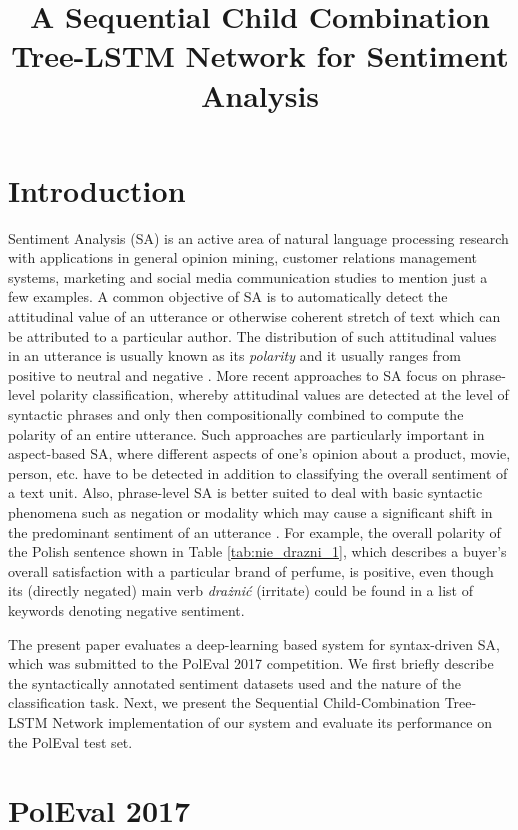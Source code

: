 \documentclass[10pt, a4paper]{article}
\title{A Sequential Child Combination Tree-LSTM Network for Sentiment Analysis}
\begin{document}
\maketitleabstract

\section{Introduction}   
Sentiment Analysis (SA) is an active area of natural language processing research with applications in general opinion mining, customer relations management systems, marketing and social media communication studies to mention just a few examples. A common objective of SA is to automatically detect the attitudinal value of an utterance or otherwise coherent stretch of text which can be attributed to a particular author. The distribution of  such attitudinal values in an utterance is usually known as its \textit{polarity} and it usually ranges from positive to neutral and negative \cite{cambria_schuller}. More recent approaches to SA focus on phrase-level polarity classification, whereby attitudinal values are detected at the level of syntactic phrases and only then compositionally combined to compute the polarity of an entire utterance. Such approaches are particularly important in aspect-based SA, where different aspects of one's opinion about a product, movie, person, etc. have to be detected in addition to  classifying the overall sentiment of a text unit. Also, phrase-level SA is better suited to deal with basic syntactic phenomena such as negation or modality which may cause a significant shift in the predominant sentiment of an utterance \cite{wilson_wiebe}. For example, the overall polarity of the Polish sentence shown in Table \ref{tab:nie_drazni_1}, which describes a buyer's overall satisfaction with a particular brand of perfume, is positive, even though its (directly negated) main verb \textit{drażnić} (irritate) could be found in a list of keywords denoting negative sentiment. 
\par The present paper evaluates a deep-learning based system for syntax-driven SA, which was submitted to the PolEval 2017 competition. We first briefly describe the syntactically annotated sentiment datasets used and the nature of the classification task. Next, we present the Sequential Child-Combination Tree-LSTM Network implementation of our system and evaluate its performance on the PolEval test set.


\section{PolEval 2017}
\end{document}
